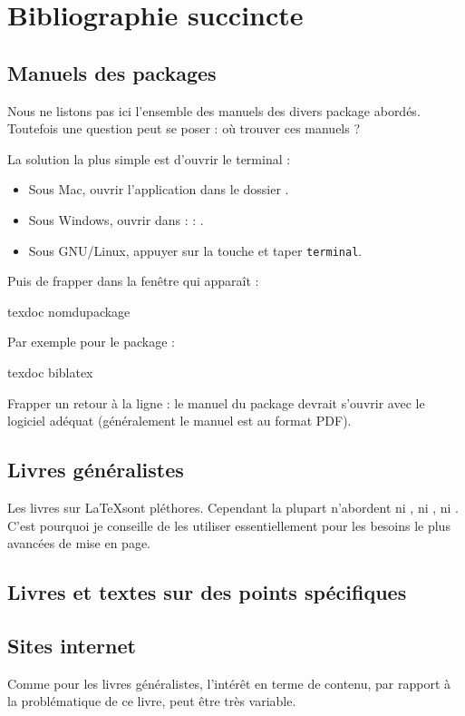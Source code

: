 \chapter{Bibliographie succincte}

\nocite{*}
\section{Manuels des packages \label{manuels}}


Nous ne listons pas ici l'ensemble des manuels des divers package abordés. Toutefois une question peut se poser : où trouver ces manuels ?

La solution la plus simple est d'ouvrir le terminal :
\begin{itemize}
\item Sous Mac, ouvrir l'application  dans le dossier .
\item Sous Windows, ouvrir  dans  :  : .
\item Sous GNU/Linux, appuyer sur la touche  et  taper \verb|terminal|.
\end{itemize}

Puis de frapper dans la fenêtre qui apparaît :

\begin{bashcode}
texdoc nomdupackage
\end{bashcode}

Par exemple pour le package :

\begin{bashcode}
texdoc biblatex
\end{bashcode}

Frapper un retour à la ligne : le manuel du package devrait s'ouvrir avec le logiciel adéquat (généralement le manuel est au format PDF).

\section{Livres généralistes}

Les livres sur \LaTeX sont pléthores. Cependant la plupart n'abordent ni \XeLaTeX, ni , ni . C'est pourquoi je conseille de les utiliser essentiellement pour les besoins le plus avancées de mise en page.

\printbibliography[keyword=generaliste]

\section{Livres et textes sur des points spécifiques}

\printbibliography[keyword=specifique]


\section{Sites internet}

Comme pour les livres généralistes,  l'intérêt en terme de contenu, par rapport à la problématique de ce livre, peut être très variable. 

\printbibliography[keyword=site]
